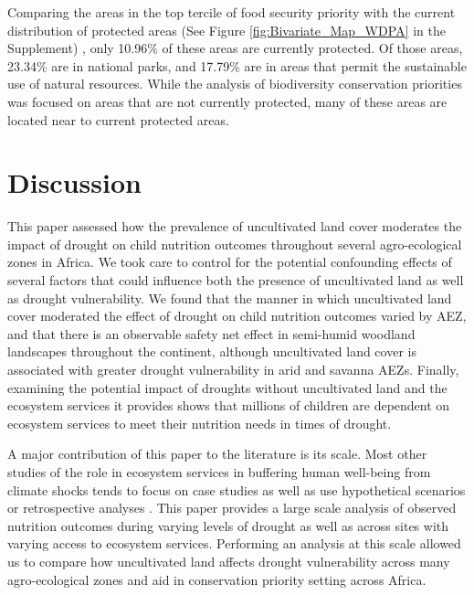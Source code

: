 \documentclass[titlepage]{article}
\begin{document}
Comparing the areas in the top tercile of food security priority with the current distribution of protected areas (See Figure \ref{fig:Bivariate_Map_WDPA} in the Supplement) \citep{UNEP-WCMC2021}, only 10.96\% of these areas are currently protected.  Of those areas, 23.34\% are in national parks, and 17.79\% are in areas that permit the sustainable use of natural resources.  While the analysis of biodiversity conservation priorities was focused on areas that are not currently protected, many of these areas are located near to current protected areas.

\section{Discussion}

This paper assessed how the prevalence of uncultivated land cover moderates the impact of drought on child nutrition outcomes throughout several agro-ecological zones in Africa.  We took care to control for the potential confounding effects of several factors that could influence both the presence of uncultivated land as well as drought vulnerability.  We found that the manner in which uncultivated land cover moderated the effect of drought on child nutrition outcomes varied by AEZ, and that there is an observable safety net effect in semi-humid woodland landscapes throughout the continent, although uncultivated land cover is associated with greater drought vulnerability in arid and savanna AEZs.  Finally, examining the potential impact of droughts without uncultivated land and the ecosystem services it provides shows that millions of children are dependent on ecosystem services to meet their nutrition needs in times of drought.

A major contribution of this paper to the literature is its scale.  Most other studies of the role in ecosystem services in buffering human well-being from climate shocks tends to focus on case studies \citep{Debela2012} as well as use hypothetical scenarios \citep{Robledo2012} or retrospective analyses \citep{Muller2008}.  This paper provides a large scale analysis of observed nutrition outcomes during varying levels of drought as well as across sites with varying access to ecosystem services.  Performing an analysis at this scale allowed us to compare how uncultivated land affects drought vulnerability across many agro-ecological zones and aid in conservation priority setting across Africa.
\end{document}
